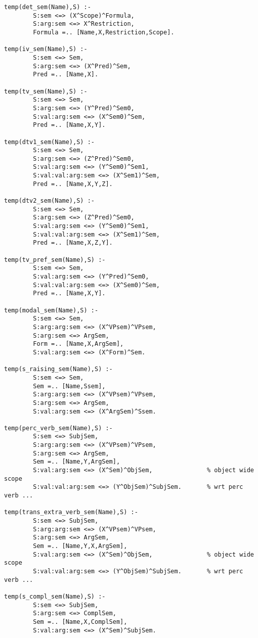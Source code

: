 \begin{verbatim}
temp(det_sem(Name),S) :-
        S:sem <=> (X^Scope)^Formula,
        S:arg:sem <=> X^Restriction,
        Formula =.. [Name,X,Restriction,Scope].
                
temp(iv_sem(Name),S) :-
        S:sem <=> Sem,
        S:arg:sem <=> (X^Pred)^Sem,
        Pred =.. [Name,X].
        
temp(tv_sem(Name),S) :-
        S:sem <=> Sem,
        S:arg:sem <=> (Y^Pred)^Sem0,
        S:val:arg:sem <=> (X^Sem0)^Sem,
        Pred =.. [Name,X,Y].

temp(dtv1_sem(Name),S) :-
        S:sem <=> Sem,
        S:arg:sem <=> (Z^Pred)^Sem0,
        S:val:arg:sem <=> (Y^Sem0)^Sem1,
        S:val:val:arg:sem <=> (X^Sem1)^Sem,
        Pred =.. [Name,X,Y,Z].
        
temp(dtv2_sem(Name),S) :-
        S:sem <=> Sem,
        S:arg:sem <=> (Z^Pred)^Sem0,
        S:val:arg:sem <=> (Y^Sem0)^Sem1,
        S:val:val:arg:sem <=> (X^Sem1)^Sem,
        Pred =.. [Name,X,Z,Y].
        
temp(tv_pref_sem(Name),S) :-
        S:sem <=> Sem,
        S:val:arg:sem <=> (Y^Pred)^Sem0,
        S:val:val:arg:sem <=> (X^Sem0)^Sem,
        Pred =.. [Name,X,Y].
        
temp(modal_sem(Name),S) :-
        S:sem <=> Sem,
        S:arg:arg:sem <=> (X^VPsem)^VPsem,
        S:arg:sem <=> ArgSem,
        Form =.. [Name,X,ArgSem],
        S:val:arg:sem <=> (X^Form)^Sem.
        
temp(s_raising_sem(Name),S) :-
        S:sem <=> Sem,
        Sem =.. [Name,Ssem],
        S:arg:arg:sem <=> (X^VPsem)^VPsem,
        S:arg:sem <=> ArgSem,
        S:val:arg:sem <=> (X^ArgSem)^Ssem.
        
temp(perc_verb_sem(Name),S) :-
        S:sem <=> SubjSem,
        S:arg:arg:sem <=> (X^VPsem)^VPsem,
        S:arg:sem <=> ArgSem,
        Sem =.. [Name,Y,ArgSem],
        S:val:arg:sem <=> (X^Sem)^ObjSem,               % object wide scope 
        S:val:val:arg:sem <=> (Y^ObjSem)^SubjSem.       % wrt perc verb ...

temp(trans_extra_verb_sem(Name),S) :-
        S:sem <=> SubjSem,
        S:arg:arg:sem <=> (X^VPsem)^VPsem,
        S:arg:sem <=> ArgSem,
        Sem =.. [Name,Y,X,ArgSem],
        S:val:arg:sem <=> (X^Sem)^ObjSem,               % object wide scope 
        S:val:val:arg:sem <=> (Y^ObjSem)^SubjSem.       % wrt perc verb ...

temp(s_compl_sem(Name),S) :-
        S:sem <=> SubjSem,
        S:arg:sem <=> ComplSem,
        Sem =.. [Name,X,ComplSem],
        S:val:arg:sem <=> (X^Sem)^SubjSem.
        

\end{verbatim}
